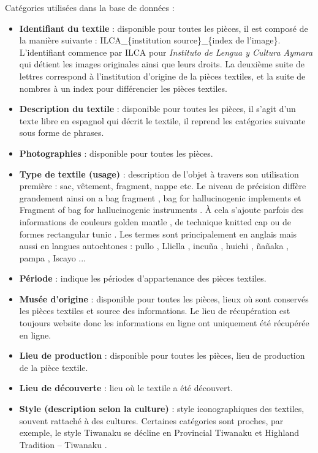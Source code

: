 \noindent Catégories utilisées dans la base de données : 
\begin{citer}
	\begin{itemize}
		\item \textbf{Identifiant du textile} : disponible pour toutes les pièces, il est composé de la manière suivante : ILCA\_\{institution source\}\_\{index de l'image\}. L'identifiant commence par ILCA pour \textit{Instituto de Lengua y Cultura Aymara} qui détient les images originales ainsi que leurs droits. La deuxième suite de lettres correspond à l'institution d'origine de la pièces textiles, et la suite de nombres à un index pour différencier les pièces textiles.
		\item  \textbf{Description du textile} : disponible pour toutes les pièces, il s'agit d'un texte libre en espagnol qui décrit le textile, il reprend les catégories suivante sous forme de phrases.
		\item  \textbf{Photographies} : disponible pour toutes les pièces.
		\item  \textbf{Type de textile (usage)} : description de l'objet à travers son utilisation première : sac, vêtement, fragment, nappe etc. Le niveau de précision diffère grandement ainsi on a \og bag fragment \fg, \og bag for hallucinogenic implements \fg\: et \og Fragment of bag for hallucinogenic instruments \fg. À cela s'ajoute parfois des informations de couleurs \og golden mantle \fg, de technique \og knitted cap \fg \:ou de formes \og rectangular tunic \fg.
Les termes sont principalement en anglais mais aussi en langues autochtones : \og pullo \fg, \og Lliclla \fg, \og incuña \fg, \og huichi \fg, ñañaka \fg, \og pampa \fg, \og Iscayo \fg...
		\item  \textbf{Période} : indique les périodes d'appartenance des pièces textiles.
		\item  \textbf{Musée d'origine} : disponible pour toutes les pièces, lieux où sont conservés les pièces textiles et source des informations. Le lieu de récupération est toujours website donc les informations en ligne ont uniquement été récupérée en ligne.
		\item \textbf{Lieu de production} : disponible pour toutes les pièces, lieu de production de la pièce textile.
		\item  \textbf{Lieu de découverte} : lieu où le textile a été découvert.
		\item  \textbf{Style (description selon la culture)} : style iconographiques des textiles, souvent rattaché à des cultures. Certaines catégories sont proches, par exemple, le style Tiwanaku se décline en \og Provincial Tiwanaku \fg\: et \og Highland Tradition -- Tiwanaku \fg.

\end{itemize}
\end{citer}
